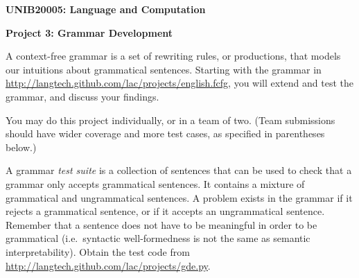 \documentclass[a4paper,10pt]{article}
\begin{document}
\centerline{\LARGE\bf UNIB20005: Language and Computation}\vspace{2ex}

\centerline{\large\bf Project 3: Grammar Development}\vspace{2ex}

A context-free grammar is a set of rewriting rules, or productions, that models
our intuitions about grammatical sentences.  Starting with the grammar
in \url{http://langtech.github.com/lac/projects/english.fcfg},
you will extend and test the grammar, and discuss your findings.

You may do this project individually, or in a team of two.
(Team submissions should have wider coverage and more test cases,
as specified in parentheses below.)

A grammar \emph{test suite} is a collection of sentences that can be used to
check that a grammar only accepts grammatical sentences.  It contains a mixture of
grammatical and ungrammatical sentences.  A problem exists in the grammar if it
rejects a grammatical sentence, or if it accepts an ungrammatical sentence.
Remember that a sentence does not have to be meaningful in order to be
grammatical (i.e.\ syntactic well-formedness is not the same as semantic interpretability).
Obtain the test code from \url{http://langtech.github.com/lac/projects/gde.py}. 
\end{document}
